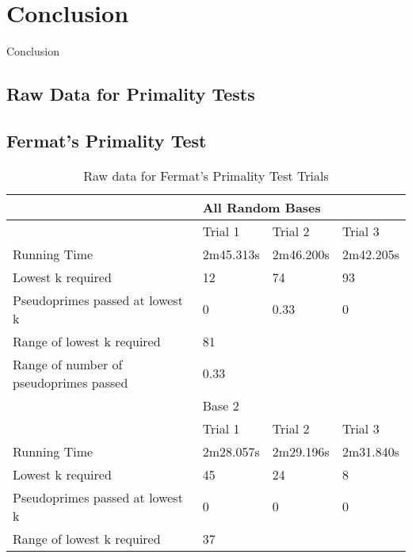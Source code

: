 \documentclass{article}
\begin{document}
\section{Conclusion}
Conclusion

\nocite{*}



\appendix
\begin{appendices}
\section{Raw Data for Primality Tests}

\subsection{Fermat's Primality Test}
\FloatBarrier
\begin{table}[h]
\caption{Raw data for Fermat's Primality Test Trials}
\label{table:fermat}
\begin{tabular}{@{}llll@{}}
\toprule
                                       & \multicolumn{3}{l}{All Random Bases}  \\ \midrule
                                       & Trial 1     & Trial 2    & Trial 3    \\
Running Time                           & 2m45.313s   & 2m46.200s  & 2m42.205s  \\
Lowest k required                      & 12          & 74         & 93         \\
Pseudoprimes passed at lowest k        & 0           & 0.33       & 0          \\\cmidrule(lr){2-4}
Range of lowest k required             & \multicolumn{3}{l}{81}                \\
Range of number of pseudoprimes passed & \multicolumn{3}{l}{0.33}              \\\midrule
                                       & \multicolumn{3}{l}{Base 2}            \\\midrule
                                       & Trial 1     & Trial 2    & Trial 3    \\
Running Time                           & 2m28.057s   & 2m29.196s  & 2m31.840s  \\
Lowest k required                      & 45          & 24         & 8          \\
Pseudoprimes passed at lowest k        & 0           & 0          & 0          \\\cmidrule(lr){2-4}
Range of lowest k required             & \multicolumn{3}{l}{37}                \\

\end{tabular}
\end{table}
\end{appendices}
\end{document}
